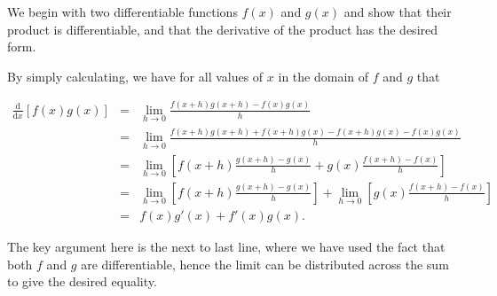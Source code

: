 \documentclass[12pt]{article}
\newcommand{\D}[1]{\ensuremath{\mathrm{d}#1}}
\begin{document}
We begin with two differentiable functions $f(x)$ and $g(x)$ and show that their product is differentiable, and that the derivative of the product has the desired form.

By simply calculating, we have for all values of $x$ in the domain of $f$ and $g$ that 

\begin{eqnarray*}
\frac{\D{}}{\D{x}}\left[f(x)g(x)\right]
& = & \lim_{h\to0}\frac{f(x+h)g(x+h) - f(x)g(x)}{h} \\
& = & \lim_{h\to0}\frac{f(x+h)g(x+h) + f(x+h)g(x) - f(x+h)g(x) - f(x)g(x)}{h} \\
& = & \lim_{h\to0}\left[f(x+h)\frac{g(x+h)-g(x)}{h} + g(x)\frac{f(x+h)-f(x)}{h}\right] \\
& = & \lim_{h\to0}\left[f(x+h)\frac{g(x+h)-g(x)}{h}\right] + \lim_{h\to0}\left[g(x)\frac{f(x+h)-f(x)}{h}\right] \\
& = & f(x)g'(x) + f'(x)g(x).
\end{eqnarray*}

The key argument here is the next to last line, where we have used the fact that both $f$ and $g$ are differentiable, hence the limit can be distributed across the sum to give the desired equality.
\end{document}
